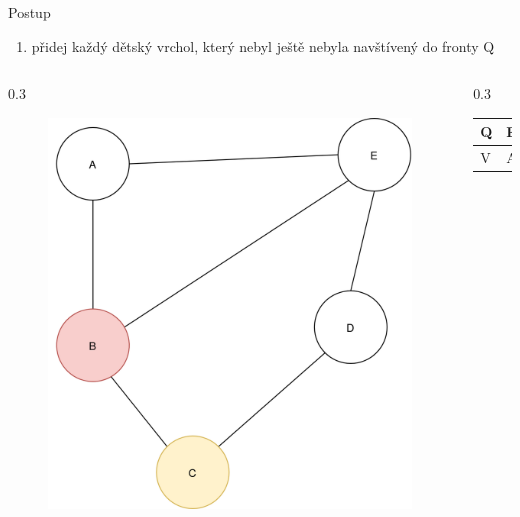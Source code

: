 \documentclass[hyperref={unicode}]{beamer}
\begin{document}
\begin{frame}
\begin{block}{Postup}
\begin{enumerate}
  [default]
    \item přidej každý dětský vrchol, který nebyl ještě nebyla navštívený do fronty Q
\end{enumerate}
\end{block}
  \begin{columns}[T]
    \begin{column}{0.3\linewidth}
        \begin{figure}
        \includegraphics[width=\linewidth]{state4.png}
        \end{figure}
    \end{column}
    \begin{column}{0.3\linewidth}
    \begin{table}[]
        \begin{tabular}{|l||l|l|l|}
        \hline
        Q & E & C &  \\ \hline
        V & A & B &  \\ \hline
        \end{tabular}
\end{table}
    \end{column}
  \end{columns}
\end{frame}
\end{document}
